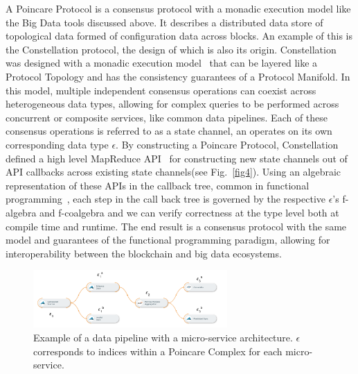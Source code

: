 \documentclass[runningheads]{llncs}
\begin{document}
A Poincare Protocol is a consensus protocol with a monadic execution model like the Big Data tools discussed above. It describes a distributed data store of topological data formed of configuration data across blocks. An example of this is the Constellation protocol, the design of which is also its origin. Constellation was designed with a monadic execution model~\cite{ref_url6} that can be layered like a Protocol Topology and has the consistency guarantees of a Protocol Manifold. In this model, multiple independent consensus operations can coexist across heterogeneous data types, allowing for complex queries to be performed across concurrent or composite services, like common data pipelines. Each of these consensus operations is referred to as a state channel, an operates on its own corresponding data type $\epsilon$. By constructing a Poincare Protocol, Constellation defined a high level MapReduce API~\cite{ref_url3} for constructing new state channels out of API callbacks across existing state channels(see Fig.~\ref{fig4}). Using an algebraic representation of these APIs in the callback tree, common in functional programming~\cite{ref_book3}, each step in the call back tree is governed by the respective $\epsilon$'s f-algebra and f-coalgebra and we can verify correctness at the type level both at compile time and runtime. The end result is a consensus protocol with the same model and guarantees of the functional programming paradigm, allowing for interoperability between the blockchain and big data ecosystems. 
\begin{figure}
\centering
\includegraphics[height=2.2cm,width=0.75\columnwidth]{data-pipeline.png}
\caption{Example of a data pipeline with a micro-service architecture. $\epsilon$ corresponds to indices within a Poincare Complex for each micro-service.} \label{fig3}
\end{figure}
\end{document}
